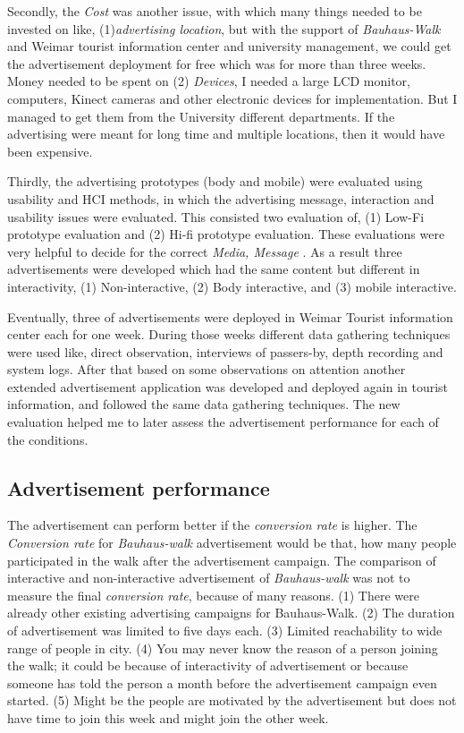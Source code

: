 Secondly, the \emph{Cost} was another issue, with which many things needed to be invested on like, (1)\emph{advertising location}, but with the support of \emph{Bauhaus-Walk} and Weimar tourist information center and university management, we could get the advertisement deployment for free which was for more than three weeks. Money needed to be spent on (2) \emph{Devices}, I needed a large LCD monitor, computers, Kinect cameras and other electronic devices for implementation. But I managed to get them from the University different departments. If the advertising were meant for long time and multiple locations, then it would have been expensive. 

Thirdly, the advertising prototypes (body and mobile) were evaluated using usability and HCI methods, in which the advertising message, interaction and usability issues were evaluated. This consisted two evaluation of, (1) Low-Fi prototype evaluation and (2) Hi-fi prototype evaluation. These evaluations were very helpful to decide for the correct \emph{Media, Message }. As a result three advertisements were developed which had the same content but different in interactivity, (1) Non-interactive, (2) Body interactive, and (3) mobile interactive.

Eventually, three of advertisements were deployed in Weimar Tourist information center each for one week. During those weeks different data gathering techniques were used like, direct observation, interviews of passers-by, depth recording and system logs. After that based on some observations on attention another extended advertisement application was developed and deployed again in tourist information, and followed the same data gathering techniques.  The new evaluation helped me to later assess the advertisement performance for each of the conditions.


\subsection{Advertisement performance}
The advertisement can perform better if the \emph{conversion rate} is higher. The \emph{Conversion rate} for \emph{Bauhaus-walk} advertisement would be that, how many people participated in the walk after the advertisement campaign. The comparison of interactive and non-interactive advertisement of \emph{Bauhaus-walk} was not to measure the final \emph{conversion rate}, because of many reasons. (1) There were already other existing advertising campaigns for Bauhaus-Walk. (2) The duration of advertisement was limited to five days each. (3) Limited reachability to wide range of people in city. (4) You may never know the reason of a person joining the walk; it could be because of interactivity of advertisement or because someone has told the person a month before the advertisement campaign even started. (5) Might be the people are motivated by the advertisement but does not have time to join this week and might join the other week.

